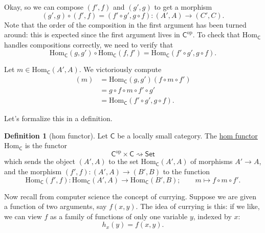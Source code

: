 \documentclass[a4paper]{report}
\newcommand{\defn}[1]{\ul{#1}}
\newcommand{\Hom}{\mathrm{Hom}}
\theoremstyle{definition}
\newtheorem{definition}{Definition}[section]
\theoremstyle{plain}
\theoremstyle{remark}
\begin{document}
Okay, so we can compose $(f', f)$ and $(g', g)$ to get a morphism 
\begin{equation*}
  (g', g) \circ (f', f) = (f' \circ g', g \circ f)\colon (A', A) \to (C', C).
\end{equation*}
Note that the order of the composition in the first argument has been turned around: this is expected since the first argument lives in $\mathsf{C}^{\mathrm{op}}$. To check that $\Hom_{\mathsf{C}}$ handles compositions correctly, we need to verify that 
\begin{equation*}
  \Hom_{\mathsf{C}}(g, g') \circ \Hom_{\mathsf{C}}(f, f') = \Hom_{\mathsf{C}}(f' \circ g', g \circ f).
\end{equation*}

Let $m \in \Hom_{\mathsf{C}}(A', A)$. We victoriously compute
\begin{align*}
  [\Hom_{\mathsf{C}}(g, g') \circ \Hom_{\mathsf{C}}(f, f')](m) &= \Hom_{\mathsf{C}}(g, g')(f \circ m \circ f') \\
  &= g \circ f \circ m \circ f' \circ g' \\
  &= \Hom_{\mathsf{C}}(f' \circ g', g \circ f).
\end{align*}

Let's formalize this in a definition.
\begin{definition}[hom functor]
  \label{def:homfunctor}
  Let $\mathsf{C}$ be a locally small category. The \defn{hom functor} $\Hom_{\mathsf{C}}$ is the functor 
  \begin{equation*}
    \mathsf{C}^{\mathrm{op}} \times \mathsf{C} \rightsquigarrow \mathsf{Set}
  \end{equation*}
  which sends the object $(A', A)$ to the set $\Hom_{\mathsf{C}}(A', A)$ of morphisms $A' \to A$, and the morphism $(f', f)\colon (A', A) \to (B', B)$ to the function
  \begin{equation*}
    \Hom_{\mathsf{C}}(f', f)\colon \Hom_{\mathsf{C}}(A', A) \to \Hom_{\mathsf{C}}(B', B);\qquad m \mapsto f \circ m \circ f'.
  \end{equation*}
\end{definition}

Now recall from computer science the concept of currying. Suppose we are given a function of two arguments, say $f(x, y)$. The idea of currying is this: if we like, we can view $f$ as a family of functions of only one variable $y$, indexed by $x$:
\begin{equation*}
  h_{x}(y) = f(x, y).
\end{equation*}
\end{document}
